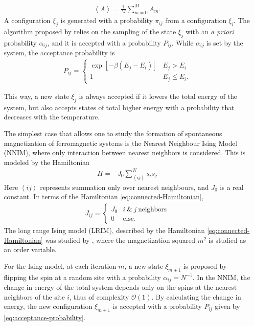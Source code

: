 \begin{align}
	\left<A \right> = \frac{1}{M} \sum_{m=0}^M A_m.
\end{align}
A configuration $\xi_j$  is generated with a probability $\pi_{ij}$ from a configuration $\xi_i$. The algorithm proposed by \cite{Metropolis1953} relies on the sampling of the state $\xi_j$ with an \textit{a priori} probability  $\alpha_{ij}$, and it is accepted with a probability $P_{ij}$. While $\alpha_{ij}$ is set by the system, the acceptance probability is  \begin{align}
	P_{ij} = 
	\begin{cases}
		\exp[-\beta (E_{j}	- E_{i})] & E_j > E_i \\
		1 & E_j \leq E_i. 
	\end{cases}
	\label{eq:acceptance-probability}
\end{align}

This way, a new state $\xi_j$ is always accepted if it lowers the total energy of the system, but also accepts states of total higher energy with a probability that decreases with the temperature.

The simplest case that allows one to study the formation of spontaneous magnetization of ferromagnetic systems is the Nearest Neighbour Ising Model (NNIM), where only interaction between nearest neighbors is considered. This is modeled by the Hamiltonian
\begin{align}
	H  = - J_0 \sum_{\left<ij \right>}^N s_i s_j
\end{align} 
Here $\left< ij \right>$ represents summation only over nearest neighbours, and $J_0$ is a real constant. In terms of the Hamiltonian \eqref{eq:connected-Hamiltonian}, 
\begin{align}
	J_{ij} = 
	\begin{cases}
	J_0 & i ~\& ~j ~\text{neighbors} \\	
	0 & \text{else}.
	\end{cases}
\end{align}
The long range Ising model (LRIM), described by the Hamiltonian \eqref{eq:connected-Hamiltonian} was studied by \cite{Janke2023}, where the magnetization squared $m^2$ is studied as an order variable. 

For the Ising model, at each iteration $m$, a new state $\xi_{m+1}$ is proposed by flipping the spin at a random site with a probability $\alpha_{ij} = N^{-1}$.  In the NNIM, the change in energy of the total system depends only on the spins at the nearest neighbors of the site $i$, thus of complexity $\mathcal{O}(1)$. By calculating the change in energy, the new configuration $\xi_{m+1}$ is accepted with a probability $P_{ij}$ given by \eqref{eq:acceptance-probability}.

